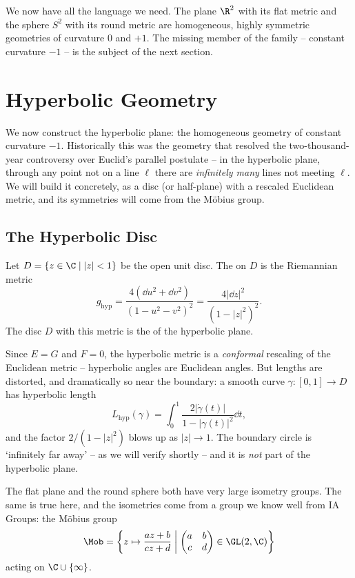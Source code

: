 We now have all the language we need. The plane $\R^2$ with its flat metric and the sphere $S^2$ with its round metric are homogeneous, highly symmetric geometries of curvature $0$ and $+1$. The missing member of the family -- constant curvature $-1$ -- is the subject of the next section.

\section{Hyperbolic Geometry}

We now construct the hyperbolic plane: the homogeneous geometry of constant curvature $-1$. Historically this was the geometry that resolved the two-thousand-year controversy over Euclid's parallel postulate -- in the hyperbolic plane, through any point not on a line $\ell$ there are \emph{infinitely many} lines not meeting $\ell$. We will build it concretely, as a disc (or half-plane) with a rescaled Euclidean metric, and its symmetries will come from the M\"obius group.

\subsection{The Hyperbolic Disc}

\begin{definition}
    Let $D = \{z \in \C \mid |z| < 1\}$ be the open unit disc. The  on $D$ is the Riemannian metric
    $$
    g_{\mathrm{hyp}} = \frac{4 (\dd u^2 + \dd v^2)}{(1 - u^2 - v^2)^2} = \frac{4|\dd z|^2}{(1 - |z|^2)^2}.
    $$
    The disc $D$ with this metric is the  of the hyperbolic plane.
\end{definition}

Since $E = G$ and $F = 0$, the hyperbolic metric is a \emph{conformal} rescaling of the Euclidean metric -- hyperbolic angles are Euclidean angles. But lengths are distorted, and dramatically so near the boundary: a smooth curve $\gamma: [0,1] \rightarrow D$ has hyperbolic length
$$
L_{\mathrm{hyp}}(\gamma) = \int_0^1 \frac{2 |\dot\gamma(t)|}{1 - |\gamma(t)|^2} \dd t,
$$
and the factor $2/(1 - |z|^2)$ blows up as $|z| \rightarrow 1$. The boundary circle is `infinitely far away' -- as we will verify shortly -- and it is \emph{not} part of the hyperbolic plane.

The flat plane and the round sphere both have very large isometry groups. The same is true here, and the isometries come from a group we know well from IA Groups: the M\"obius group
$$
\Mob = \left\{z \mapsto \frac{az + b}{cz + d} \;\middle|\; \begin{pmatrix} a & b \\ c & d\end{pmatrix} \in \GL(2, \C)\right\}
$$
acting on $\C \cup \{\infty\}$.

